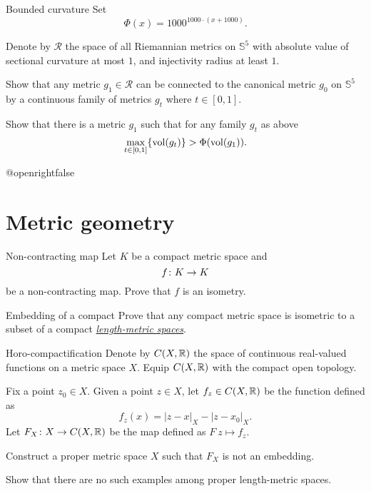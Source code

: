 \documentclass[twoside]{book}
\begin{document}
\begin{pr}{\thm}{Bounded curvature}\label{Bounded curvature}
Set 
\[\Phi(x)=1000^{1000\cdot (x+1000)}.\]

Denote by $\mathcal{R}$ the space of 
all Riemannian metrics on $\mathbb S^5$
with absolute value of sectional curvature at most $1$,
and injectivity radius at least $1$.

Show that any metric $g_1\in \mathcal{R}$ 
can be connected to the canonical metric $g_0$ on $\mathbb S^5$
by a continuous family of metrics $g_t$ where $t\in[0,1]$.

Show that there is a metric $g_1$ 
such that 
for any family $g_t$ as above
\[\max_{t\in[0,1]}\{\operatorname{\rm vol}(g_t)\}
>
\Phi(\operatorname{\rm vol}(g_1)).\]
\end{pr}





\csname @openrightfalse\endcsname
\chapter{Metric geometry}


\begin{pr}{\easy}{Non-contracting map}\label{Noncontracting map}
Let $K$  be a compact metric space and
\[f\:K\z\to K\] 
be a non-contracting map.
Prove that $f$ is an isometry.
\end{pr}




\begin{pr}{}{Embedding of a compact}\label{compact} 
Prove that any compact metric space 
is isometric to 
a subset of a compact \hyperref[Length-metric space]{\emph{length-metric spaces}}.
\end{pr}

\begin{pr}{\easy}{Horo-compactification}\label{Horo-compactification}
Denote by $C(X,\mathbb{R})$ the space of continuous real-valued functions 
on a metric space $X$.
Equip $C(X,\mathbb{R})$ with the compact open topology.

Fix a point $z_0\in X$.
Given a point $z\in X$, let $f_z\in C(X,\mathbb{R})$ be the function defined as 
\[f_z(x)=|z-x|_X-|z-x_0|_X.\]
Let $F_X\colon X\to C(X,\mathbb{R})$ be the map 
defined as $F\:z\mapsto f_z$.

Construct a proper metric space $X$
such that $F_X$ is not an embedding.

Show that there are no such examples among proper length-metric spaces.
\end{pr}
\end{document}
